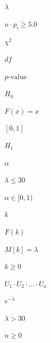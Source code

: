 \documentclass{article}
\begin{document}
$\lambda$
\pagebreak

$n \cdot p_i \ge 5.0$
\pagebreak

$\chi^2$
\pagebreak

$df$
\pagebreak

$p\text{-value}$
\pagebreak

$H_0$
\pagebreak

$F(x) = x$
\pagebreak

$[0, 1]$
\pagebreak

$H_1$
\pagebreak

$\alpha$
\pagebreak

$\lambda \le 30$
\pagebreak

$\alpha \in [0, 1)$
\pagebreak

$k$
\pagebreak

$F(k)$
\pagebreak

$M[k] = \lambda$
\pagebreak

$k \ge 0$
\pagebreak

$U_1 \cdot U_2 \cdot \dots \cdot U_n$
\pagebreak

$e^{-\lambda}$
\pagebreak

$\lambda > 30$
\pagebreak

$n \ge 0$
\pagebreak
\end{document}
